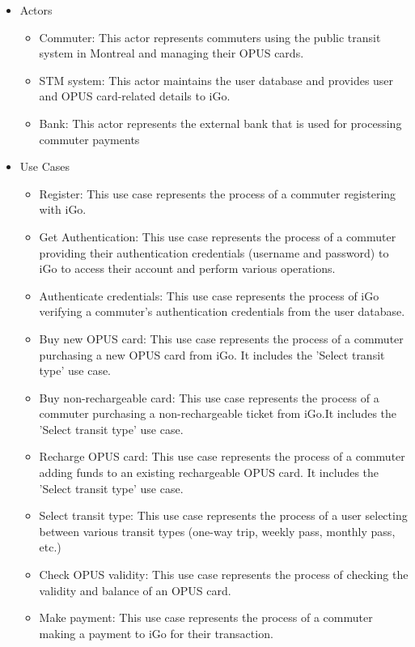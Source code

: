 \documentclass[a4paper,12pt]{article}
\begin{document}
\begin{itemize}
    \item Actors
    \begin{itemize}
        \item Commuter: This actor represents commuters using the public transit system in Montreal and managing their OPUS cards.
        \item STM system: This actor maintains the user database and provides user and OPUS card-related details to iGo.
        \item Bank: This actor represents the external bank that is used for processing commuter payments
    \end{itemize}
    \item Use Cases
    \begin{itemize}
        \item Register: This use case represents the process of a commuter registering with iGo.
        \item Get Authentication: This use case represents the process of a commuter providing their authentication credentials (username and password) to iGo to access their account and perform various operations.
        \item Authenticate credentials: This use case represents the process of iGo verifying a commuter's authentication credentials from the user database.
        \item Buy new OPUS card: This use case represents the process of a commuter purchasing a new OPUS card from iGo. It includes the 'Select transit type' use case.
        \item Buy non-rechargeable card: This use case represents the process of a commuter purchasing a non-rechargeable ticket from iGo.It includes the 'Select transit type' use case.
        \item Recharge OPUS card: This use case represents the process of a commuter adding funds to an existing rechargeable OPUS card. It includes the 'Select transit type' use case.
        \item Select transit type: This use case represents the process of a user selecting between various transit types (one-way trip, weekly pass, monthly pass, etc.)
        \item Check OPUS validity: This use case represents the process of checking the validity and balance of an OPUS card.
        \item Make payment: This use case represents the process of a commuter making a payment to iGo for their transaction.
    \end{itemize}
\end{itemize}
\end{document}
